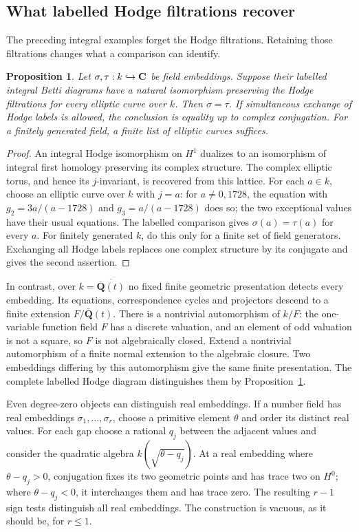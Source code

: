 \documentclass[11pt]{article}
\newtheorem{proposition}[theorem]{Proposition}
\theoremstyle{definition}\newtheorem{definition}[theorem]{Definition}
\theoremstyle{remark}\newtheorem{remark}[theorem]{Remark}
\newcommand{\Qb}{\overline{\mathbf Q}}\newcommand{\Fp}{\mathbf F_p}
\begin{document}
\subsection{What labelled Hodge filtrations recover}\label{subsec:enrichment}
The preceding integral examples forget the Hodge filtrations. Retaining those filtrations changes what a comparison can identify.

\begin{proposition}\label{prop:enriched-embeddings}
Let $\sigma,\tau:k\hookrightarrow\mathbf C$ be field embeddings. Suppose their labelled integral Betti diagrams have a natural isomorphism preserving the Hodge filtrations for every elliptic curve over $k$. Then $\sigma=\tau$. If simultaneous exchange of Hodge labels is allowed, the conclusion is equality up to complex conjugation. For a finitely generated field, a finite list of elliptic curves suffices.
\end{proposition}
\begin{proof}
An integral Hodge isomorphism on $H^1$ dualizes to an isomorphism of integral first homology preserving its complex structure. The complex elliptic torus, and hence its $j$-invariant, is recovered from this lattice. For each $a\in k$, choose an elliptic curve over $k$ with $j=a$: for $a\ne0,1728$, the equation with $g_2=3a/(a-1728)$ and $g_3=a/(a-1728)$ does so; the two exceptional values have their usual equations. The labelled comparison gives $\sigma(a)=\tau(a)$ for every $a$. For finitely generated $k$, do this only for a finite set of field generators. Exchanging all Hodge labels replaces one complex structure by its conjugate and gives the second assertion.
\end{proof}

In contrast, over $k=\overline{\Qb(t)}$ no fixed finite geometric presentation detects every embedding. Its equations, correspondence cycles and projectors descend to a finite extension $F/\Qb(t)$. There is a nontrivial automorphism of $k/F$: the one-variable function field $F$ has a discrete valuation, and an element of odd valuation is not a square, so $F$ is not algebraically closed. Extend a nontrivial automorphism of a finite normal extension to the algebraic closure. Two embeddings differing by this automorphism give the same finite presentation. The complete labelled Hodge diagram distinguishes them by Proposition~\ref{prop:enriched-embeddings}.

Even degree-zero objects can distinguish real embeddings. If a number field has real embeddings $\sigma_1,\ldots,\sigma_r$, choose a primitive element $\theta$ and order its distinct real values. For each gap choose a rational $q_j$ between the adjacent values and consider the quadratic algebra $k(\sqrt{\theta-q_j})$. At a real embedding where $\theta-q_j>0$, conjugation fixes its two geometric points and has trace two on $H^0$; where $\theta-q_j<0$, it interchanges them and has trace zero. The resulting $r-1$ sign tests distinguish all real embeddings. The construction is vacuous, as it should be, for $r\le1$.
\end{document}
